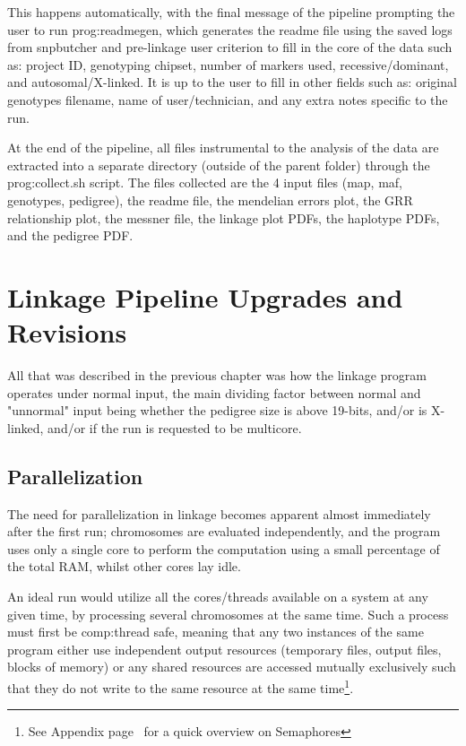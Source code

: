 This happens automatically, with the final message of the pipeline prompting the user to run \gls{prog:readmegen}, which generates the readme file using the saved logs from snpbutcher and pre-linkage user criterion to fill in the core of the data such as: project ID, genotyping chipset, number of markers used, recessive/dominant, and autosomal/X-linked. It is up to the user to fill in other fields such as: original genotypes filename, name of user/technician, and any extra notes specific to the run.

At the end of the pipeline, all files instrumental to the analysis of the data are extracted into a separate directory (outside of the parent folder) through the \gls{prog:collect.sh} script. The files collected are the 4 input files (map, maf, genotypes, pedigree), the readme file, the mendelian errors plot, the GRR relationship plot, the messner file, the linkage plot PDFs, the haplotype PDFs, and the pedigree PDF.


\section{Linkage Pipeline Upgrades and Revisions}

All that was described in the previous chapter was how the linkage program operates under normal input, the main dividing factor between normal and "unnormal" input being whether the pedigree size is above 19-bits, and/or is X-linked, and/or if the run is requested to be multicore.

\subsection{Parallelization}

The need for parallelization in linkage becomes apparent almost immediately after the first run; chromosomes are evaluated independently, and the program uses only a single core to perform the computation using a small percentage of the total RAM, whilst other cores lay idle.

An ideal run would utilize all the cores/threads available on a system at any given time, by processing several chromosomes at the same time. Such a process must first be \gls{comp:thread safe}, meaning that any two instances of the same program either use independent output resources (temporary files, output files, blocks of memory) or any shared resources are accessed mutually exclusively such that they do not write to the same resource at the same time\footnote{See Appendix page~\pageref{ref:app:semaphores} for a quick overview on Semaphores}.

